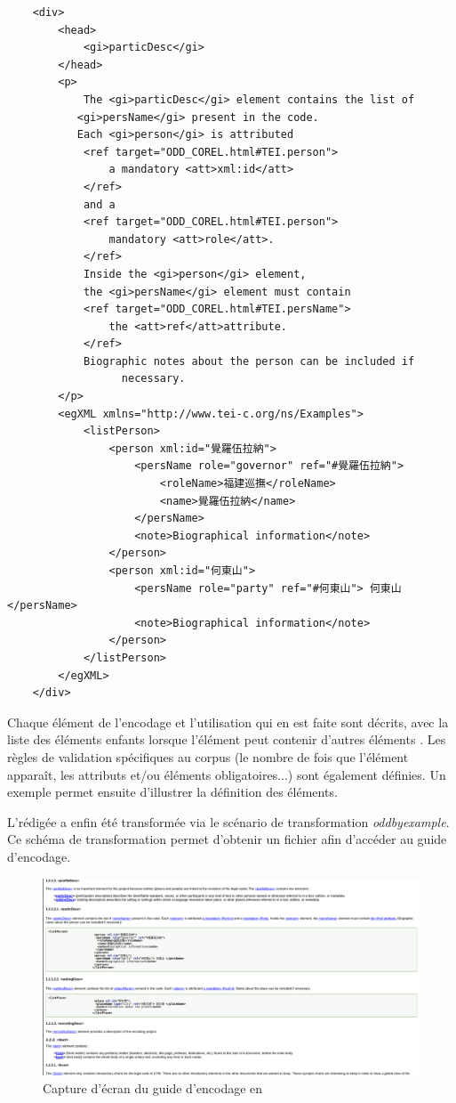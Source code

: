 \begin{verbatim}
    <div>
        <head>
            <gi>particDesc</gi>
        </head>
        <p>
            The <gi>particDesc</gi> element contains the list of 
           <gi>persName</gi> present in the code. 
           Each <gi>person</gi> is attributed 
            <ref target="ODD_COREL.html#TEI.person">
                a mandatory <att>xml:id</att>
            </ref> 
            and a 
            <ref target="ODD_COREL.html#TEI.person">
                mandatory <att>role</att>.
            </ref> 
            Inside the <gi>person</gi> element, 
            the <gi>persName</gi> element must contain 
            <ref target="ODD_COREL.html#TEI.persName">
                the <att>ref</att>attribute.
            </ref> 
            Biographic notes about the person can be included if
                  necessary.
        </p>
        <egXML xmlns="http://www.tei-c.org/ns/Examples">
            <listPerson>
                <person xml:id="覺羅伍拉納">
                    <persName role="governor" ref="#覺羅伍拉納">
                        <roleName>福建巡撫</roleName>
                        <name>覺羅伍拉納</name>
                    </persName>
                    <note>Biographical information</note>
                </person>
                <person xml:id="何東山">
                    <persName role="party" ref="#何東山"> 何東山 </persName>
                    <note>Biographical information</note>
                </person>
            </listPerson>
        </egXML>
    </div>
\end{verbatim}

Chaque élément de l'encodage et l'utilisation qui en est faite sont décrits, avec la liste des éléments enfants lorsque l'élément peut contenir d'autres éléments \TEI. Les règles de validation spécifiques au corpus (le nombre de fois que l'élément apparaît, les attributs et/ou éléments obligatoires...) sont également définies. Un exemple permet ensuite d'illustrer la définition des éléments. 

L'\ODD rédigée a enfin été transformée via le scénario de transformation \textit{oddbyexample}. Ce schéma de transformation permet d'obtenir un fichier \HTML afin d'accéder au guide d'encodage.

\begin{figure}
    \centering
    \includegraphics[width=\textwidth]{images/odd.png}
    \caption{Capture d'écran du guide d'encodage en \HTML}
\end{figure}

